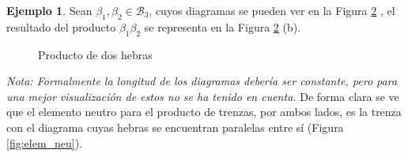 \documentclass[12pt]{article}
\theoremstyle{definition}
\newtheorem{ejem}{Ejemplo}[section]
\begin{document}
\begin{ejem}
Sean $\beta_1,\beta_2\in \mathcal{B}_3$, cuyos diagramas se pueden ver en la Figura \ref{fig:producto_hebras} , el resultado del producto $\beta_1\beta_2$ se representa en la Figura \ref{fig:producto_hebras} (b).
\begin{figure}[h!]
\centering
	\begin{subfigure}[b]{0.45\linewidth}
		\begin{center}
		\end{center}
		
		\caption{}
		\label{subfig:factores}
	\end{subfigure}
	\begin{subfigure}[b]{0.45\linewidth}
		\begin{center}
		\end{center}
		\caption{}
	\end{subfigure}
	\caption{Producto de dos hebras}
	\label{fig:producto_hebras}
\end{figure}
\end{ejem}








\textit{Nota: Formalmente la longitud de los diagramas debería ser constante, pero para una mejor visualización de estos no se ha tenido en cuenta.}
\newline
\newline
De forma clara se ve que el elemento neutro para el producto de trenzas, por ambos lados, es la trenza con el diagrama cuyas hebras se encuentran paralelas entre sí (Figura \ref{fig:elem_neu}).

\end{document}
